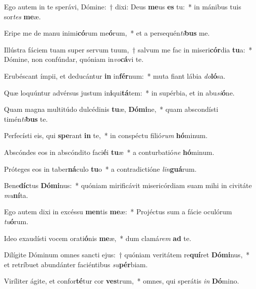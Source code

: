 \item Ego autem in te sperávi, Dómine:~† dixi: Deus \textbf{me}us \textbf{es} tu:~* in mánibus tuis sor\textit{tes} \textbf{me}æ.
\item Eripe me de manu inimi\textbf{có}rum me\textbf{ó}rum,~* et a persequén\textit{ti}\textbf{bus} me.
\item Illústra fáciem tuam super servum tuum,~† salvum me fac in miseri\textbf{cór}dia \textbf{tu}a:~* Dómine, non confúndar, quóniam in\textit{vo}\textbf{cá}vi te.
\item Erubéscant ímpii, et deducántur \textbf{in} in\textbf{fér}num:~* muta fiant lábia \textit{do}\textbf{ló}sa.
\item Quæ loquúntur advérsus justum in\textbf{i}qui\textbf{tá}tem:~* in supérbia, et in abu\textit{si}\textbf{ó}ne.
\item Quam magna multitúdo dulcédinis \textbf{tu}æ, \textbf{Dó}\textbf{mi}ne,~* quam abscondísti timén\textit{ti}\textbf{bus} te.
\item Perfecísti eis, qui \textbf{spe}rant \textbf{in} te,~* in conspéctu filió\textit{rum} \textbf{hó}minum.
\item Abscóndes eos in abscóndito faci\textbf{é}i \textbf{tu}æ~* a conturbatió\textit{ne} \textbf{hó}minum.
\item Próteges eos in taber\textbf{ná}culo \textbf{tu}o~* a contradictióne \textit{lin}\textbf{guá}rum.
\item Bene\textbf{díc}tus \textbf{Dó}\textbf{mi}nus:~* quóniam mirificávit misericórdiam suam mihi in civitáte \textit{mu}\textbf{ní}ta.
\item Ego autem dixi in excéssu \textbf{men}tis \textbf{me}æ:~* Projéctus sum a fácie oculórum \textit{tu}\textbf{ó}rum.
\item Ideo exaudísti vocem orati\textbf{ó}nis \textbf{me}æ,~* dum clamá\textit{rem} \textbf{ad} te.
\item Dilígite Dóminum omnes sancti ejus:~† quóniam veritátem re\textbf{quí}ret \textbf{Dó}\textbf{mi}nus,~* et retríbuet abundánter faciéntibus \textit{su}\textbf{pér}biam.
\item Viríliter ágite, et confor\textbf{té}tur cor \textbf{ves}trum,~* omnes, qui sperátis \textit{in} \textbf{Dó}mino.
